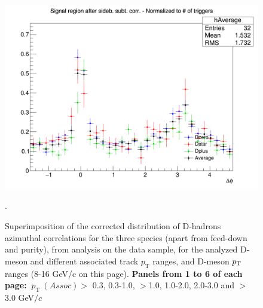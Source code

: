 \begin{figure}
{\includegraphics[width=0.48\linewidth]{figures/Averages/AzimCorrDistr_Canvas_PtIntBins8to16_PoolInt_thr3dotto99dot_Superimp.png}}
\caption{Superimposition of the corrected distribution of D-hadrons azimuthal correlations for the three species (apart from feed-down and purity), from analysis on the data sample, for the analyzed D-meson and different associated track $p_\text{T}$ ranges, and D-meson $p_{\rm T}$ ranges (8-16 GeV/c on this page). \textbf{Panels from 1 to 6 of each page:} $ \ p_\text{T}~(Assoc)>$ 0.3, 0.3-1.0, $>$1.0, 1.0-2.0, 2.0-3.0 and $>$3.0 GeV$/c$}.
\label{fig:Data_Res_D0DpDs3}
\end{figure}
\newpage
